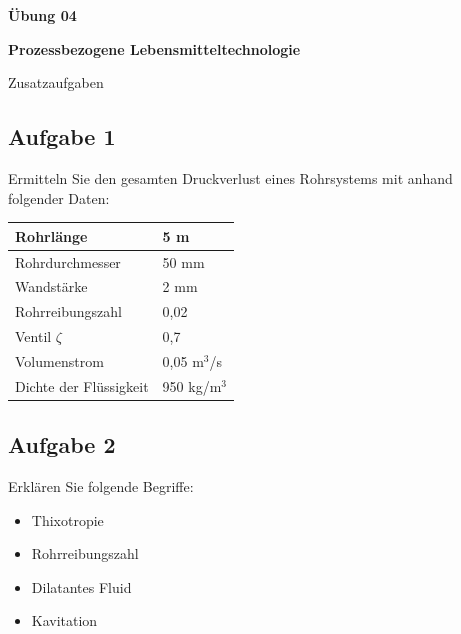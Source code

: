 \documentclass[a4paper,11pt]{article}
\begin{document}


\begin{center}
\LARGE
\color{uniblau}
\textbf{Übung 04} \par \vspace*{2mm}
\large \color{miugray!50!black} \textbf{Prozessbezogene Lebensmitteltechnologie}\par 
\normalsize Zusatzaufgaben
\end{center}
\par 


\color{miudiutex}


\subsection*{Aufgabe 1}
Ermitteln Sie den gesamten Druckverlust eines Rohrsystems mit  anhand folgender Daten:

\begin{center}
\begin{tabular}{l|l}
\rowcolor{miugray!50}
Rohrlänge & 5 m \\ \hline
Rohrdurchmesser & 50 mm \\ \hline 
Wandstärke & 2 mm \\ \hline 
Rohrreibungszahl & 0,02 \\ \hline
Ventil $\zeta$ & 0,7 \\ \hline 
Volumenstrom & 0,05 m$^3$/s \\ \hline 
Dichte der Flüssigkeit & 950 kg/m$^3$ \\ \hline 
\end{tabular}

\end{center}

\subsection*{Aufgabe 2}
Erklären Sie folgende Begriffe:
\begin{itemize}
\item Thixotropie
\item Rohrreibungszahl
\item Dilatantes Fluid
\item Kavitation
\end{itemize}
\end{document}
